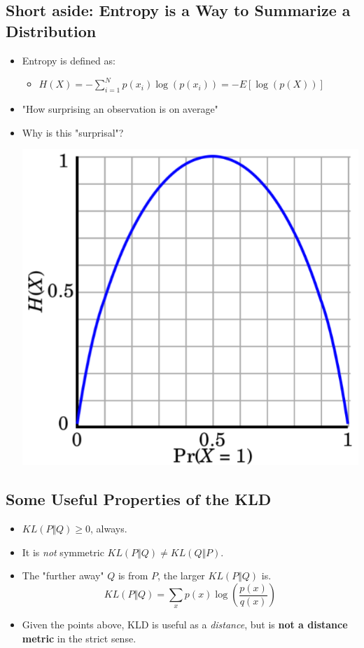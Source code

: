 \documentclass[10pt]{article}
\begin{document}
\subsection*{Short aside: Entropy is a Way to Summarize a Distribution}
\begin{itemize}
    \item Entropy is defined as:
    \begin{itemize}
        \item $H(X) = -\sum_{i=1}^N p(x_i) \log(p(x_i)) = -E[\log(p(X))]$
    \end{itemize}
    \item "How surprising an observation is on average"
    \item Why is this "surprisal"?
\begin{center}
    \includegraphics*[scale=0.6]{W8_9.png}
\end{center}
\end{itemize}

\subsection*{Some Useful Properties of the KLD}
\begin{itemize}
    \item $KL(P \Vert Q) \geq 0$, always.
    \item It is \textit{not} symmetric $KL(P \Vert Q) \neq KL(Q \Vert P)$.
    \item The "further away" $Q$ is from $P$, the larger $KL(P \Vert Q)$ is.
    \[KL(P \Vert Q) = \sum_x p(x) \log(\frac{p(x)}{q(x)})\]
    \item Given the points above, KLD is useful as a \textit{distance}, but is \textbf{not a distance metric} in the strict sense.
\end{itemize}
\end{document}
